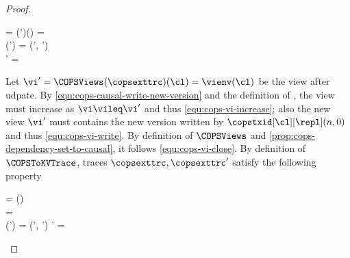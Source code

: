 \begin{proof}
\begin{enumerate}
\begin{enumerate}
\begin{Formulae}
        \begin{Formula}
        \begin{multlined}
            \vi = \COPSViews(\copsexttrc')(\cl) 
            \land \copsexttrc = 
            \\ {} \land \LastConf(\copsexttrc') = (\cops', \copsctxenv')
            \\ {} \land \copsctxenv' = \copsctxenv{}
        \end{multlined}
        \label{equ:cops-causal-write-new-version}
        \end{Formula}
        \end{Formulae}
        Let \( \vi' = \COPSViews(\copsexttrc)(\cl) = \vienv(\cl) \) be the view after udpate.
        By \cref{equ:cops-causal-write-new-version} and the definition of \COPSViews, 
        the view must increase as \(\vi \vileq \vi' \) and thus \cref{equ:cops-vi-increase};
        also the new view \( \vi' \) must contains the new version written by \(\copstxid[\cl][\repl](n,0) \)
        and thus \cref{equ:cops-vi-write}.
        By definition of \( \COPSViews\) and \cref{prop:cops-dependency-set-to-causal}, 
        it follows \cref{equ:cops-vi-close}.
        By definition of \( \COPSToKVTrace \), traces \( \copsexttrc, \copsexttrc' \) satisfy the following property
        \begin{Formulae}
        \begin{Formula}
        \begin{multlined}
            \vi = \vienv(\cl) 
            \\ {} \land \copsexttrc =  
            \\ {} \land \LastConf(\copsexttrc') = (\cops', \copsctxenv')
            \land \copsctxenv' = \copsctxenv{}
        \end{multlined}

\end{Formula}
\end{Formulae}
\end{enumerate}
\end{enumerate}
\end{proof}
